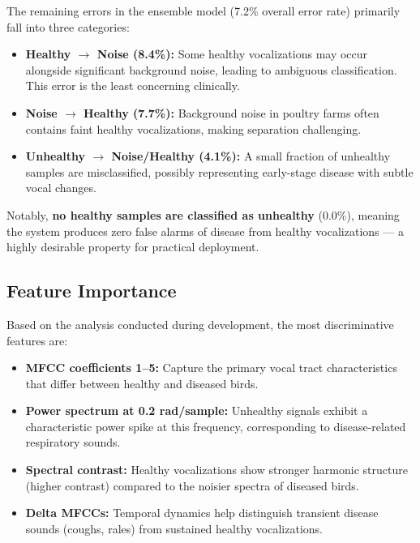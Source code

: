 \documentclass[12pt,a4paper]{report}
\begin{document}
The remaining errors in the ensemble model (7.2\% overall error rate) primarily fall into three categories:
\begin{itemize}
    \item \textbf{Healthy $\to$ Noise (8.4\%):} Some healthy vocalizations may occur alongside significant background noise, leading to ambiguous classification. This error is the least concerning clinically.
    \item \textbf{Noise $\to$ Healthy (7.7\%):} Background noise in poultry farms often contains faint healthy vocalizations, making separation challenging.
    \item \textbf{Unhealthy $\to$ Noise/Healthy (4.1\%):} A small fraction of unhealthy samples are misclassified, possibly representing early-stage disease with subtle vocal changes.
\end{itemize}

Notably, \textbf{no healthy samples are classified as unhealthy} (0.0\%), meaning the system produces zero false alarms of disease from healthy vocalizations --- a highly desirable property for practical deployment.

\subsection{Feature Importance}

Based on the analysis conducted during development, the most discriminative features are:
\begin{itemize}
    \item \textbf{MFCC coefficients 1--5:} Capture the primary vocal tract characteristics that differ between healthy and diseased birds.
    \item \textbf{Power spectrum at 0.2 rad/sample:} Unhealthy signals exhibit a characteristic power spike at this frequency, corresponding to disease-related respiratory sounds.
    \item \textbf{Spectral contrast:} Healthy vocalizations show stronger harmonic structure (higher contrast) compared to the noisier spectra of diseased birds.
    \item \textbf{Delta MFCCs:} Temporal dynamics help distinguish transient disease sounds (coughs, rales) from sustained healthy vocalizations.
\end{itemize}


\end{document}
